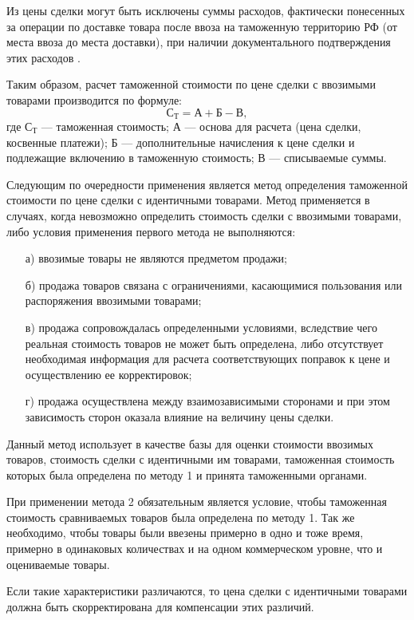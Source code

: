 Из цены сделки могут быть исключены суммы расходов, фактически понесенных за операции по доставке товара после ввоза на таможенную территорию РФ (от места ввоза до места доставки), при наличии документального подтверждения этих расходов \cites[с. 260--263]{mahovikova}[с. 528]{pokrovskaya}.

Таким образом, расчет таможенной стоимости по цене сделки с ввозимыми товарами производится по формуле:
\[\text{С}_\text{Т} = \text{А} + \text{Б} - \text{В}, \] где $\text{С}_\text{Т}$ --- таможенная стоимость; $\text{А}$ --- основа для расчета (цена сделки, косвенные платежи); $\text{Б}$ --- дополнительные начисления к цене сделки и подлежащие включению в таможенную стоимость; $\text{В}$ --- списываемые суммы.

Следующим по очередности применения является метод определения таможенной стоимости по цене сделки с идентичными товарами. Метод применяется в случаях, когда невозможно определить стоимость сделки с ввозимыми товарами, либо условия применения первого метода не выполняются:
\begin{enumerate}
	\item [а)] ввозимые товары не являются предметом продажи;
	\item [б)] продажа товаров связана с ограничениями, касающимися пользования или распоряжения ввозимыми товарами;
	\item [в)] продажа сопровождалась определенными условиями, вследствие чего реальная стоимость товаров не может быть определена, либо отсутствует необходимая информация для расчета соответствующих поправок к цене и осуществлению ее корректировок;
	\item [г)] продажа осуществлена между взаимозависимыми сторонами и при этом зависимость сторон оказала влияние на величину цены сделки.
\end{enumerate}

Данный метод использует в качестве базы для оценки стоимости ввозимых товаров, стоимость сделки с идентичными им товарами, таможенная стоимость которых была определена по методу 1 и принята таможенными органами.

При применении метода 2 обязательным является условие, чтобы таможенная стоимость сравниваемых товаров была определена по методу 1. Так же необходимо, чтобы товары были ввезены примерно в одно и тоже время, примерно в одинаковых количествах и на одном коммерческом уровне, что и оцениваемые товары.

Если такие характеристики различаются, то цена сделки с идентичными товарами должна быть скорректирована для компенсации этих различий.

